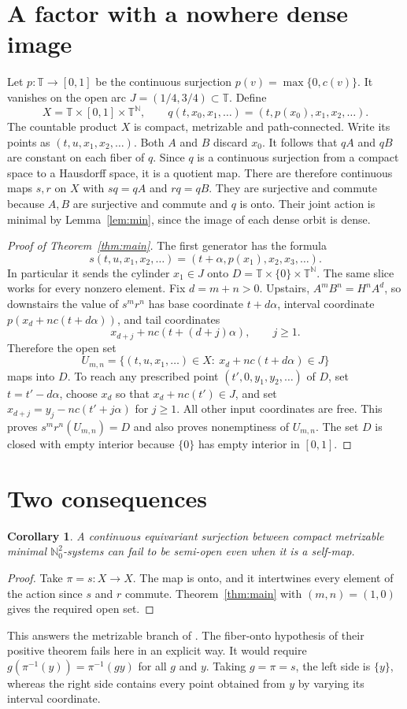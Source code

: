 \documentclass[11pt,a4paper]{article}
\newcommand{\T}{\mathbb{T}}
\newcommand{\N}{\mathbb{N}}
\newcommand{\NN}{\mathbb{N}_0}
\newtheorem{corollary}[theorem]{Corollary}
\begin{document}
\section{A factor with a nowhere dense image}
Let $p:\T\to[0,1]$ be the continuous surjection $p(v)=\max\{0,c(v)\}$.
It vanishes on the open arc $J=(1/4,3/4)\subset\T$. Define
\[
 X=\T\times[0,1]\times\T^{\N},\qquad
 q(t,x_0,x_1,\ldots)=(t,p(x_0),x_1,x_2,\ldots).
\]
The countable product $X$ is compact, metrizable and path-connected.
Write its points as $(t,u,x_1,x_2,\ldots)$. Both $A$ and $B$ discard
$x_0$. It follows that $qA$ and $qB$ are constant on each fiber of $q$.
Since $q$ is a continuous surjection from a compact space to a Hausdorff
space, it is a quotient map. There are therefore continuous maps $s,r$ on
$X$ with $sq=qA$ and $rq=qB$. They are surjective and commute because
$A,B$ are surjective and commute and $q$ is onto. Their joint action is
minimal by Lemma~\ref{lem:min}, since the image of each dense orbit is dense.

\begin{proof}[Proof of Theorem~\ref{thm:main}]
The first generator has the formula
\[
 s(t,u,x_1,x_2,\ldots)=(t+\alpha,p(x_1),x_2,x_3,\ldots).
\]
In particular it sends the cylinder $x_1\in J$ onto
$D=\T\times\{0\}\times\T^{\N}$. The same slice works for every nonzero
element. Fix $d=m+n>0$. Upstairs, $A^mB^n=H^n A^d$, so downstairs
the value of $s^m r^n$ has base coordinate $t+d\alpha$, interval coordinate
$p(x_d+n c(t+d\alpha))$, and tail coordinates
\[
 x_{d+j}+n c(t+(d+j)\alpha),\qquad j\ge1.
\]
Therefore the open set
\[
 U_{m,n}=\{(t,u,x_1,\ldots)\in X:\ x_d+n c(t+d\alpha)\in J\}
\]
maps into $D$. To reach any prescribed point $(t',0,y_1,y_2,\ldots)$ of
$D$, set $t=t'-d\alpha$, choose $x_d$ so that $x_d+n c(t')\in J$, and set
$x_{d+j}=y_j-n c(t'+j\alpha)$ for $j\ge1$. All other input coordinates
are free. This proves $s^m r^n(U_{m,n})=D$ and also proves nonemptiness of
$U_{m,n}$. The set $D$ is closed with empty interior because $\{0\}$
has empty interior in $[0,1]$.
\end{proof}

\section{Two consequences}
\begin{corollary}
A continuous equivariant surjection between compact metrizable minimal
$\NN^2$-systems can fail to be semi-open even when it is a self-map.
\end{corollary}
\begin{proof}
Take $\pi=s:X\to X$. The map is onto, and it intertwines every element of
the action since $s$ and $r$ commute. Theorem~\ref{thm:main} with $(m,n)=(1,0)$
gives the required open set.
\end{proof}
This answers the metrizable branch of \cite[Question 5.2.4]{DFLX}. The
fiber-onto hypothesis of their positive theorem \cite[Theorem 3.2]{DFLX}
fails here in an explicit way. It would require
$g(\pi^{-1}(y))=\pi^{-1}(g y)$ for all $g$ and $y$. Taking $g=\pi=s$,
the left side is $\{y\}$, whereas the right side contains every point
obtained from $y$ by varying its interval coordinate.
\end{document}
